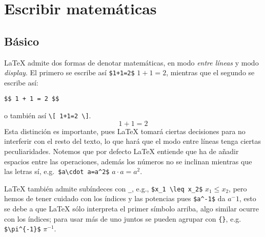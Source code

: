 \documentclass[intro-breve-latex.tex]{subfiles}
\begin{document}
\chapter{Escribir matemáticas}
\label{sec:maths}
\section{Básico}
\LaTeX{} admite dos formas de denotar matemáticas, en modo \textit{entre líneas} y modo \textit{display}. El primero se
escribe así \lstinline|$1+1=2$| $1+1=2$, mientras que el segundo se escribe así:
\begin{lstlisting}
$$ 1 + 1 = 2 $$
\end{lstlisting}
o también así \lstinline|\[ 1+1=2 \]|.
$$1+1=2$$
Esta distinción es importante, pues \LaTeX{} tomará ciertas decisiones para no interferir con el resto del texto, lo que
hará que el modo entre líneas tenga ciertas peculiaridades. Notemos que por defecto \LaTeX{} entiende que ha de añadir
espacios entre las operaciones, además los números no se inclinan mientras que las letras sí, e.g.\ 
\lstinline|$a\cdot a=a^2$| $a\cdot a=a^2$.

\LaTeX{} también admite subíndeces con \texttt{\_}, e.g., \lstinline|$x_1 \leq x_2$| $x_1 \leq x_2$, pero hemos de tener cuidado con los índices y las potencias pues \lstinline|$a^-1$| da $a^-1$, esto se debe a que \LaTeX{} sólo interpreta el primer símbolo arriba, algo similar ocurre con los índices; para usar más de uno juntos se pueden agrupar con \texttt{\{\}}, e.g. \lstinline|$\pi^{-1}$| $\pi^{-1}$.
\end{document}
